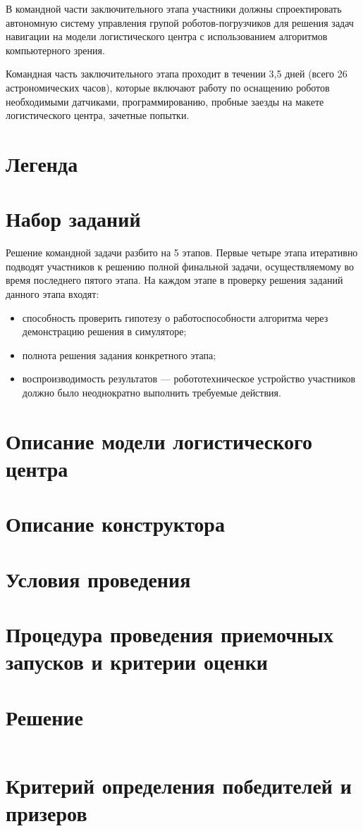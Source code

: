 В командной части заключительного этапа участники должны
спроектировать автономную систему управления групой роботов-погрузчиков
для решения задач навигации на модели логистического центра с
использованием алгоритмов компьютерного зрения.

Командная часть заключительного этапа проходит в течении
3,5 дней (всего 26 астрономических часов), которые включают работу по
оснащению роботов необходимыми датчиками, программированию, пробные заезды
на макете логистического центра, зачетные попытки.

\section{Легенда}


\section{Набор заданий}

Решение командной задачи разбито на 5 этапов. Первые четыре
этапа итеративно подводят участников к решению полной финальной
задачи, осуществляемому во время последнего пятого этапа. На
каждом этапе в проверку решения заданий данного этапа входят:
\begin{itemize}
    \item способность проверить гипотезу о работоспособности алгоритма
    через демонстрацию решения в симуляторе;
    \item полнота решения задания конкретного этапа;
    \item воспроизводимость результатов --- робототехническое
    устройство участников должно было неоднократно выполнить требуемые
    действия.
\end{itemize}



\section{Описание модели логистического центра}


\section{Описание конструктора}


\section{Условия проведения}


\section{Процедура проведения приемочных запусков и
критерии оценки}



\section{Решение}
\inputminted[fontsize=\footnotesize, linenos]{js}{final/command_tour/irs/solution.js}

\section{Критерий определения победителей и призеров}

